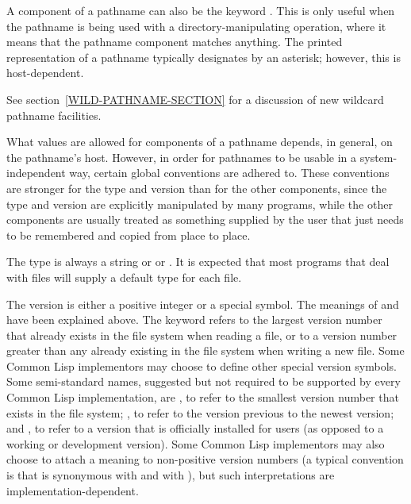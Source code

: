 \begin{obsolete}
A component of a pathname can also be the keyword .
This is only useful when the pathname is being used with a
directory-manipulating operation, where it means that the pathname
component matches anything.  The printed representation of a pathname
typically designates  by an asterisk; however, this is
host-dependent.
\end{obsolete}

\begin{newer}
See section~\ref{WILD-PATHNAME-SECTION} for a discussion of
new wildcard pathname facilities.
\end{newer}

What values are allowed for components of a pathname depends, in general,
on the pathname's host.  However, in order for pathnames to be usable
in a system-independent way, certain global conventions are adhered to.
These conventions are stronger for the type and version than for the
other components, since the type and version are explicitly manipulated by
many programs, while the other components are usually treated as something
supplied by the user that just needs to be remembered and copied
from place to place.

The type is always a string or {\nil} or .
It is expected that most
programs that deal with files will supply a default type for each file.

The version is either a positive integer or a special symbol.  The
meanings of {\nil} and  have been explained
above.  The keyword  refers to the largest version number
that already exists in the file system when reading a file, or to
a version number
greater than any already existing in the file system
when writing a new file.  Some Common Lisp implementors
may choose to define other special version symbols.
Some semi-standard names, suggested but not required to be supported
by every Common Lisp implementation, are
, to refer to the smallest version number that exists
in the file system;
, to refer to the version previous to the newest version;
and , to refer to a version that is officially installed
for users (as opposed to a working or development version).
Some Common Lisp implementors may also choose to attach a meaning to
non-positive version numbers (a typical convention is that 
is synonymous with  and  with ),
but such interpretations are implementation-dependent.

